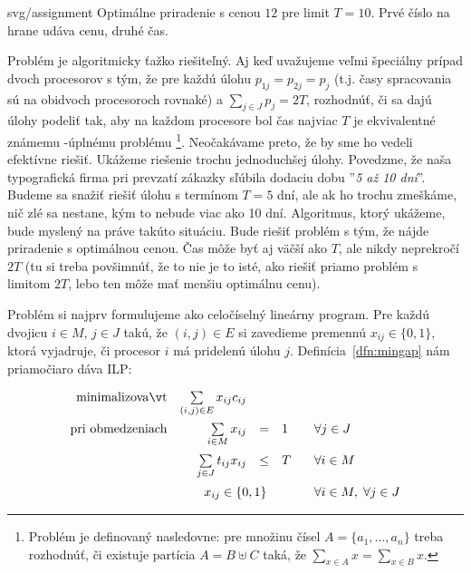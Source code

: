 \begin{myfig}{0.65\textwidth}{svg/assignment}
Optimálne priradenie s cenou $12$ pre limit $T=10$.
Prvé číslo na hrane udáva cenu, druhé čas.
\end{myfig}

\noindent
Problém \mingap je algoritmicky ťažko riešiteľný. Aj keď uvažujeme veľmi špeciálny prípad dvoch procesorov
s tým, že pre každú úlohu $p_{1j}=p_{2j}=p_j$ (t.j. časy spracovania sú na obidvoch procesoroch rovnaké)
a $\sum_{j\in J}p_j=2T$, rozhodnúť, či sa dajú úlohy podeliť tak, aby na každom procesore bol čas najviac $T$
je ekvivalentné známemu \NP-úplnému problému \footnote{
  Problém  je definovaný nasledovne: pre množinu čísel $A=\{a_1,\ldots,a_n\}$
  treba rozhodnúť, či existuje partícia $A=B\uplus C$ taká, že $\sum_{x\in A}x=\sum_{x\in B}x$.
}.
Neočakávame preto, že by sme ho vedeli efektívne riešiť. Ukážeme riešenie trochu jednoduchšej úlohy.
Povedzme, že naša typografická firma pri prevzatí zákazky sľúbila dodaciu dobu ''{\em 5 až 10 dní}''.
Budeme sa snažiť riešiť úlohu s termínom $T=5$ dní, ale ak ho trochu zmeškáme, nič zlé sa nestane, kým
to nebude viac ako 10 dní. Algoritmus, ktorý ukážeme, bude myslený na práve takúto situáciu.
Bude riešiť problém \mingap s tým, že nájde
priradenie s optimálnou cenou. Čas môže byť aj väčší ako $T$, ale nikdy neprekročí $2T$
(tu si treba povšimnúť, že to nie je to isté, ako riešiť priamo problém s limitom $2T$, lebo ten môže
mať menšiu optimálnu cenu).

\noindent
Problém \mingap si najprv formulujeme ako celočíselný lineárny program. Pre každú dvojicu
$i\in M$, $j\in J$ takú, že $(i,j)\in E$ si zavedieme premennú $x_{ij}\in\{0,1\}$, ktorá vyjadruje,
či procesor $i$ má pridelenú úlohu $j$. Definícia~\ref{dfn:mingap} nám priamočiaro dáva ILP:


\begin{equation}
\label{eq:mingap:ilp}
\begin{array}{rrcll}
  {\rm minimalizovať}     & \multicolumn{1}{l}{ \sum\limits_{(i,j)\in E}x_{ij}c_{ij}}\\[3ex]
  {\rm pri\ obmedzeniach} & \sum\limits_{i\in M} x_{ij}& = &1 & \;\;\; \forall j\in J\\[3ex]
                          & \sum\limits_{j\in J} t_{ij}x_{ij}&\le & T & \;\;\; \forall i\in M\\[3ex]
                          & \multicolumn{3}{c}{ x_{ij}\in\{0,1\}} & \;\;\; \forall i\in M, \; \forall j\in J
\end{array}
\end{equation}

